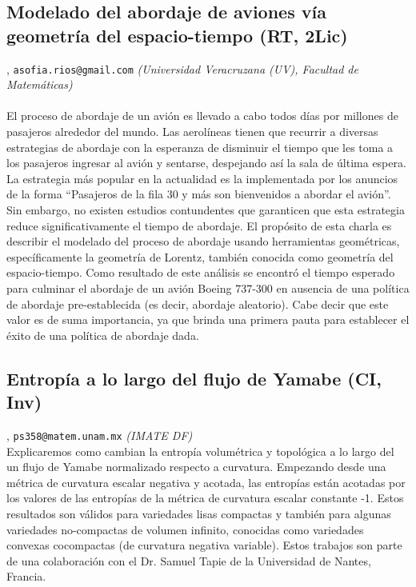 \subsection{\sffamily Modelado del abordaje de aviones v\'ia geometr\'ia del espacio-tiempo {\footnotesize (RT, 2Lic)}} \label{reg-486} 
, {\tt asofia.rios@gmail.com}  {\slshape (Universidad Veracruzana (UV), Facultad de Matem\'aticas)}\\
\\
\noindent El proceso de abordaje de un avi\'on es llevado a cabo todos d\'ias por millones de pasajeros alrededor del mundo. Las aerol\'ineas tienen que recurrir a diversas estrategias de abordaje con la esperanza de disminuir el tiempo que les toma a los pasajeros ingresar al avi\'on y sentarse,  despejando as\'i la sala de \'ultima espera. La estrategia m\'as popular en la actualidad es la implementada por los anuncios de la forma ``Pasajeros de la fila 30 y m\'as son bienvenidos a abordar el avi\'on''. Sin embargo, no existen estudios contundentes que garanticen que esta estrategia reduce significativamente el tiempo de abordaje. El prop\'osito de esta charla es describir el modelado del proceso de abordaje usando herramientas geom\'etricas, espec\'ificamente la geometr\'ia de Lorentz, tambi\'en conocida como geometr\'ia del espacio-tiempo. Como resultado de este an\'alisis se encontr\'o el tiempo esperado para  culminar el abordaje de un avi\'on Boeing 737-300 en ausencia de una pol\'itica de abordaje pre-establecida (es decir, abordaje aleatorio). Cabe decir que este valor es de suma importancia, ya que brinda una primera pauta para establecer el \'exito de una pol\'itica de abordaje dada.
\subsection{\sffamily Entrop\'ia a lo largo del flujo de Yamabe {\footnotesize (CI, Inv)}} \label{reg-1366} 
, {\tt ps358@matem.unam.mx}  {\slshape (IMATE DF)}\\
          \noindent Explicaremos como cambian la entrop\'ia volum\'etrica y topol\'ogica a lo largo del un flujo de Yamabe normalizado respecto a curvatura. Empezando desde una m\'etrica de curvatura escalar negativa y acotada, las entrop\'ias est\'an acotadas por los valores de las entrop\'ias de la m\'etrica de curvatura escalar constante -1. Estos resultados son v\'alidos para variedades lisas compactas y tambi\'en para algunas variedades no-compactas de volumen infinito, conocidas como variedades convexas cocompactas (de curvatura negativa variable).  Estos trabajos son parte de una colaboraci\'on con el Dr. Samuel Tapie de la Universidad de Nantes, Francia.
